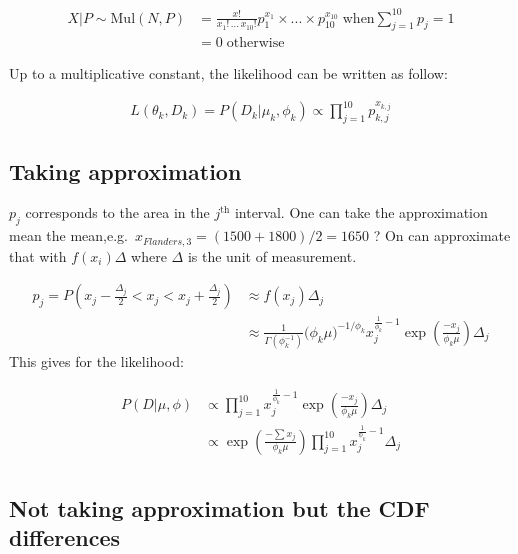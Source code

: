 \documentclass[a4paper, 12pt]{article}
\begin{document}
    \[
    \begin{split}
    X | P  \sim \text{Mul}(N,P)  & = \frac{x!}{x_{1}! \, ... \, x_{10}! } p_1^{x_1} \times ... \times p_{10}^{x_{10}} \; \text{when} \sum_{j=1}^{10} p_j = 1 \\
    &=0 \; \text{otherwise}
    \end{split}
    \]

    Up to a multiplicative constant, the likelihood can be written as
    follow:

    \[
    \begin{split}
    L(\theta_k, D_k) = P (D_k | \mu_k, \phi_k) \propto \prod_{j=1}^{10} p_{k,j}^{x_{k,j}}
    \end{split}
    \]

    \hypertarget{taking-approximation}{%
    \subsection{Taking approximation}\label{taking-approximation}}

    \(p_j\) corresponds to the area in the \(j^{\text{th}}\) interval.
    One can take the approximation mean the
    mean,e.g.~\(x_{Flanders,3} = (1500+1800)/2 = 1650\) ? On can
    approximate that with \(f(x_i) \Delta\) where \(\Delta\) is the unit
    of measurement.

    \[
    \begin{split}
    p_j =P(x_j - \frac{\Delta_j}{2} < x_j <x_j + \frac{\Delta_j}{2} ) & \approx f(x_j) \Delta_j \\
    & \approx \frac{1}{\Gamma(\phi_k^{-1})} \big( \phi_k \mu \big)^{-1/\phi_k} x_j^{\frac{1}{\phi_k}-1} \exp{(\frac{-x_j}{\phi_k \mu})} \Delta_j
    \end{split}
    \] This gives for the likelihood:

    \[
    \begin{split}
    P (D | \mu, \phi) & \propto \prod_{j=1}^{10}  x_j^{\frac{1}{\phi_k}-1} \exp{(\frac{-x_j}{\phi_k \mu})} \Delta_j \\
    & \propto \exp{(\frac{- \sum x_j}{\phi_k \mu})}  \prod_{j=1}^{10}  x_j^{\frac{1}{\phi_k}-1}  \Delta_j \\
    \end{split}
    \]

    \hypertarget{not-taking-approximation-but-the-cdf-differences}{%
    \subsection{Not taking approximation but the CDF
    differences}\label{not-taking-approximation-but-the-cdf-differences}}
\end{document}
